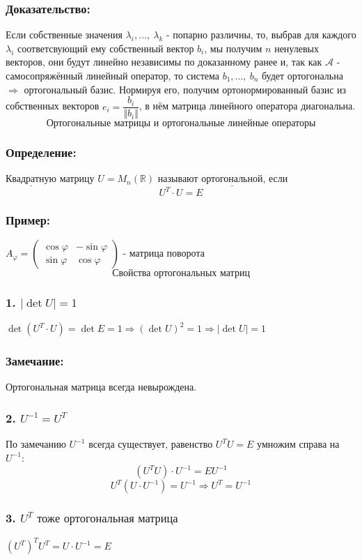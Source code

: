 \documentclass[12pt, letterpaper, twoside]{article}
\newcommand{\Underl}[1]{$\underline{\text{#1}}$}
\newcommand{\mb}[1]{\mathbb{#1}}
\begin{document}
    \subsubsection*{Доказательство:}
    Если собственные значения $\lambda_i,\dots,\ \lambda_k$ - попарно различны, то, выбрав для каждого $\lambda_i$ соответсвующий ему собственный вектор $b_i$, мы получим $n$ ненулевых векторов, они будут линейно независимы по доказанному ранее и, так как $\mathcal{A}$ - самосопряжённый линейный оператор, то система $b_1,\dots,\ b_n$ будет ортогональна $\Rightarrow$ ортогональный базис. Нормируя его, получим ортонормированный базис из собственных векторов $e_i = \dfrac{b_i}{\Vert b_i \Vert}$, в нём матрица линейного оператора диагональна.
    \[\text{Ортогональные матрицы и ортогональные линейные операторы}\]
    \subsubsection*{Определение:}
    \Underl{Квадратную} матрицу $U = M_n(\mb{R})$ называют \Underl{ортогональной}, если
    \[U^T\cdot U = E\]
    \subsubsection*{Пример:}
    $A_{\varphi} = \begin{pmatrix}
        \cos \varphi & -\sin \varphi\\
        \sin \varphi & \cos \varphi
    \end{pmatrix}$ - матрица поворота
    \[\text{Свойства ортогональных матриц}\]
    \subsubsection*{1. $|\det U| = 1$}
    $\det(U^T\cdot U) = \det E = 1\Rightarrow (\det U)^2 = 1\Rightarrow |\det U| = 1$
    \subsubsection*{Замечание:}
    Ортогональная матрица всегда невырождена.
    \subsubsection*{2. $U^{-1} = U^T$}
    По замечанию $U^{-1}$ всегда существует, равенство $U^T U = E$ умножим справа на $U^{-1}$:
    \[(U^T U)\cdot U^{-1} = E U^{-1}\]
    \[U^T(U\cdot U^{-1}) = U^{-1}\Rightarrow U^T = U^{-1}\]
    \subsubsection*{3. $\textbf{$U^T \text{ тоже ортогональная матрица}$}$}
    $(U^T)^T U^T = U\cdot U^{-1} = E$
\end{document}
